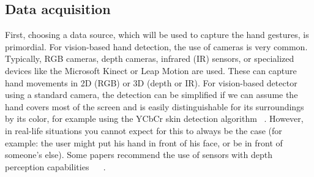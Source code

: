 \documentclass[12pt]{article}
\begin{document}
\subsection{Data acquisition}

First, choosing a data source, which will be used to capture the hand gestures, is primordial. For vision-based hand detection, the use of cameras is very common. Typically, RGB cameras, depth cameras, infrared (IR) sensors, or specialized devices like the Microsoft Kinect or Leap Motion are used. These can capture hand movements in 2D (RGB) or 3D (depth or IR).
For vision-based detector using a standard camera, the detection can be simplified if we can assume the hand covers most of the screen and is easily distinguishable for its surroundings by its color, for example using the YCbCr skin detection algorithm ~\cite{AIBINU20121183}.
However, in real-life situations you cannot expect for this to always be the case (for example: the user might put his hand in front of his face, or be in front of someone's else). Some papers recommend the use of sensors with depth perception capabilities ~\cite{sahoo2022real} ~\cite{qi2024computer}.
\end{document}
